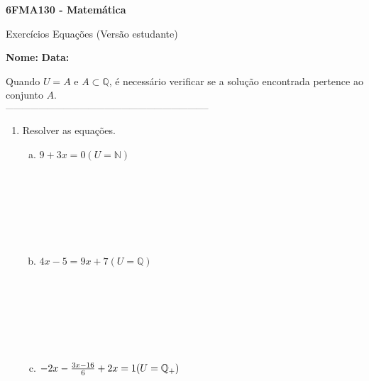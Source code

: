 \documentclass[a4paper,14pt]{article}
\begin{document}
	
	\noindent\textbf{6FMA130 - Matemática} 
	
	\begin{center}Exercícios Equações (Versão estudante)
	\end{center}
	
	\noindent\textbf{Nome:} \underline{\hspace{10cm}}
	\noindent\textbf{Data:} \underline{\hspace{4cm}}
	
	
	\begin{multicols}{2}
	    \noindent Quando $U = A$ e $ A \subset \mathbb{Q}$, é necessário verificar se a solução encontrada pertence ao conjunto $A$. \\
		\noindent\textsubscript{--------------------------------------------------------------------------}
		\begin{enumerate} 
			\item Resolver as equações.
			\begin{enumerate}[a)]
				\item $9 + 3x = 0 (U = \mathbb{N})$ \\\\\\\\\\\\\\
				\item $4x - 5 = 9x + 7 (U = \mathbb{Q})$ \\\\\\\\\\\\\\
				\item $-2x - \frac{3x - 16}{6} + 2x = 1 \\ (U = \mathbb{Q_+})$ \\\\\\\\\\\\\\\\\\\\
			\end{enumerate}

\end{enumerate}
\end{multicols}
\end{document}
